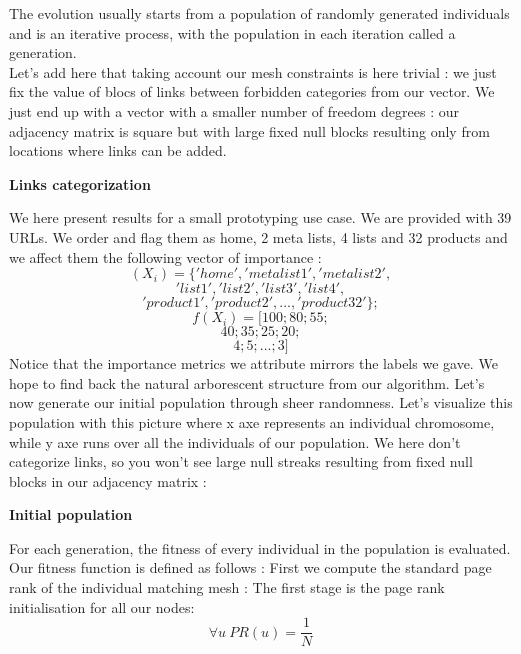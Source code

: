 \documentclass{iSWAGArticle}
\begin{document}
The evolution usually starts from a population of randomly generated individuals and is an iterative process, with the population in each iteration called a generation.
\\\newline
Let's add here that taking account our mesh constraints is here trivial : we just fix the value of blocs of links between forbidden categories from our
vector. We just end up with a vector with a smaller number of freedom degrees : our adjacency matrix is square but with large fixed null blocks resulting only from locations where links can be added.
\begin{center}
\textbf{\large Links categorization}
\end{center}
\begin{center}
\end{center}
We here present results for a small prototyping use case.
We are provided with 39 URLs. We order and flag them as home, 2 meta lists, 4 lists and 32 products and we affect them
the following vector of importance :
$$
\left(X_i\right)=\{'home','metalist1','metalist2',
$$
$$
'list1','list2','list3','list4',
$$
$$
'product1','product2',...,'product32'\};
$$
$$
f\left(X_i\right) = [100;80;55;$$
$$
40;35;25;20;
$$
$$
4;5;...;3]
$$
Notice that the importance metrics we attribute mirrors the labels we gave. We hope to find back the natural arborescent structure from our algorithm.
Let's now generate our initial population through sheer randomness. Let's visualize this population with this picture where x axe represents an individual chromosome, 
while y axe runs over all the individuals of our population. We here don't categorize links, so you won't see large null streaks resulting from fixed null blocks in our adjacency matrix :
\\\newline
\begin{center}
\textbf{\large Initial population}
\end{center}
\begin{center}
\end{center}
For each generation, the fitness of every individual in the population is evaluated. Our fitness function is defined as follows :
First we compute the standard page rank of the individual matching mesh :
The first stage is the page rank initialisation for all our nodes:
\begin{equation}
\forall u \ PR\left(u\right)=\frac{1}{N}
\end{equation} 
\end{document}
